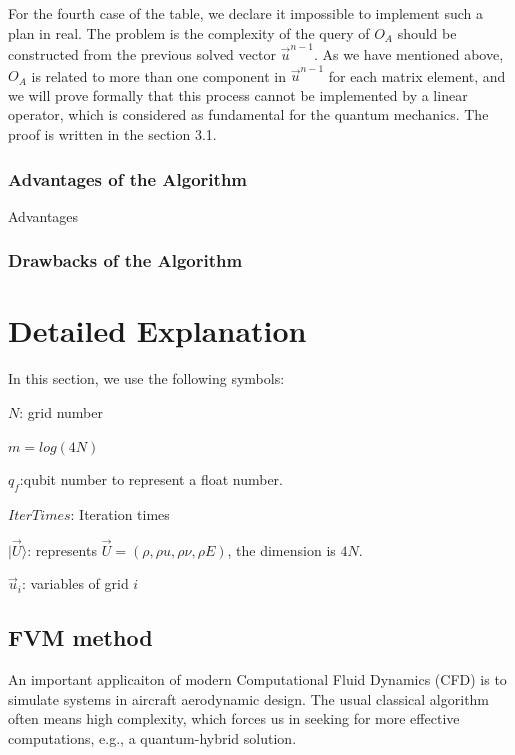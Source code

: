 \documentclass[%
 reprint,
 amsmath,amssymb,
pra,
]{revtex4-1}
\begin{document}
For the fourth case of the table, we declare it impossible to implement such a plan in real. The problem is the complexity of the query of $O_A$ should be constructed from the previous solved vector $\vec{u}^{n-1}$. As we have mentioned above, $O_A$ is related to more than one component in $\vec{u}^{n-1}$ for each matrix element, and we will prove formally that this process cannot be implemented by a linear operator, which is considered as fundamental for the quantum mechanics. The proof is written in the section 3.1.

\subsubsection{Advantages of the Algorithm}

Advantages

\subsubsection{Drawbacks of the Algorithm}



\section{Detailed Explanation}
In this section, we use the following symbols:

$N$: grid number

$m=log(4N)$

$q_f$:qubit number to represent a float number.

$IterTimes$: Iteration times

$|\vec{U}\rangle$: represents $\vec{U}=(\rho,\rho u, \rho\nu, \rho E)$, the dimension is $4N$. 

$\vec{u}_i$: variables of grid $i$ 

\subsection{FVM method}\label{classicalFVM}

An important applicaiton of modern Computational Fluid Dynamics (CFD) is to simulate systems in aircraft aerodynamic design. The usual classical algorithm often means high complexity, which forces us in seeking for more effective computations, e.g., a quantum-hybrid solution.
\end{document}
